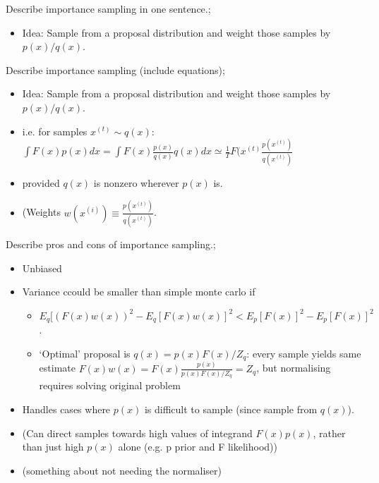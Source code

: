 \documentclass{article}
\begin{document}
Describe importance sampling in one sentence.; \begin{itemize}
    \item Idea: Sample from a proposal distribution and weight those samples by $p(x)/q(x)$.
\end{itemize}

Describe importance sampling (include equations); \begin{itemize}
    \item Idea: Sample from a proposal distribution and weight those samples by $p(x)/q(x)$.
    \item i.e. for samples $x^{(t)}\sim q(x)$: $\int F(x)p(x)dx = \int F(x)\frac{p(x)}{q(x)}q(x) dx \simeq \frac{1}{T}F(x^{(t)}\frac{p(x^{(t)})}{q(x^{(t)})}$
    \item provided $q(x)$ is nonzero wherever $p(x)$ is. 
    \item (Weights $w(x^{(i)}) \equiv \frac{p(x^{(t)})}{q(x^{(t)})}$.
\end{itemize}

Describe pros and cons of importance sampling.; \begin{itemize}
    \item Unbiased
    \item Variance ccould be smaller than simple monte carlo if 
    \begin{itemize}
        \item $E_q[(F(x)w(x))^2 - E_q [F(x)w(x)]^2 < E_p [F(x)]^2 - E_p [F(x)]^2$.
        \item `Optimal' proposal is $q(x) = p(x)F(x)/Z_q$: every sample yields same estimate $F(x)w(x) = F(x)\frac{p(x)}{p(x)F(x)/Z_q}=Z_q$, but normalising requires solving original problem
    \end{itemize}
    \item Handles cases where $p(x)$ is difficult to sample (since sample from $q(x)$).
    \item (Can direct samples towards high values of integrand $F(x)p(x)$, rather than just high $p(x)$ alone (e.g. p prior and F likelihood))
    \item (something about not needing the normaliser)
\end{itemize}
\end{document}
